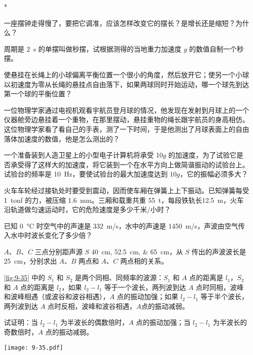 \begin{Exercise}*
\begin{question}
  \item 一座摆钟走得慢了，要把它调准，应该怎样改变它的摆长？是增长还是缩短？为什么？
  \item 周期是 \qty{2}{s} 的单摆叫做秒摆，试根据测得的当地重力加速度 $g$ 的数值自制一个秒摆。
  \item 使悬挂在长绳上的小球偏离平衡位置一个很小的角度，然后放开它；使另一个小球以初速度为零从长绳的悬挂点自由落下，如果两球同时开始运动，哪一个球先到达第一个球的平衡位置？
  \item 一位物理学家通过电视机观看宇航员登月球的情况，他发现在发射到月球上的一个仪器舱旁边悬挂着一个重物，在那里摆动，悬挂重物的绳长跟宇航员的身高相仿。这位物理学家看了看自己的手表，测了一下时间，于是他测出了月球表面上的自由落体加速度的数值，他是怎么测出的？
  \item 一个准备装到人造卫星上的小型电子计算机将承受 10$g$ 的加速度，为了试验它是否承受得了这样大的加速度，将它装到一个在水平方向上做简谐振动的试验台上。试验台的频率是 \qty{10}{Hz}，要使试验台的最大加速度达到 $10g$，它的振幅必须多大？
  \item 火车车轮经过接轨处时要受到震动，因而使车厢在弹簧上上下振动。已知弹簧每受 \qty{1}{tonf} 的力，被压缩 \qty{1.6}{mm}。三厢和载重共重 \qty{55}{t}，每段铁轨长\qty{12.5}{m}，火车沿轨道做匀速运动时，它的危险速度是多少千米/小时？
  \item 已知 \qty{0}{\celsius} 时空气中的声速是 \qty{332}{m/s}，水中的声速是 \qty{1450}{m/s}，声波由空气传入水中时波长变化了多少倍？
  \item $A$、$B$、$C$ 三点分别距声源 $S$ \qtylist{40;52.5;65}{cm}，从 $S$ 传出的声波波长是\qty{25}{cm}，分别求出 $A$、$B$ 两点和 $A$、$C$ 两点相的关系。
  \item \cref{fig:9-35} 中的 $S_1$ 和 $S_2$ 是两个同相、同频率的波源：$S_1$ 和 $A$ 点的距离是 $l_1$，$S_2$ 和 $A$ 点的距离是 $l_2$，如果 $l_2-l_1$ 等于一个波长，两列波到达 $A$ 点时同相，波峰和波峰相遇（或波谷和波谷相遇），$A$ 点的振动加强；如果 $l_2-l_1$ 等于半个波长，两列波到达 $A$ 点时反相，波峰和波谷相遇，$A$点的振动减弱。

  试证明：当 $l_2-l_1$ 为半波长的偶数倍时，$A$ 点的振动加强；当 $l_2-l_1$ 为半波长的奇数倍时，$A$ 点的振动减弱。
\end{question}
\begin{figurehere}
  \begin{minipage}{\linewidth}\centering
    \texttt{[image: 9-35.pdf]}
    \caption{}\label{fig:9-35}
  \end{minipage}
\end{figurehere}
\end{Exercise}
